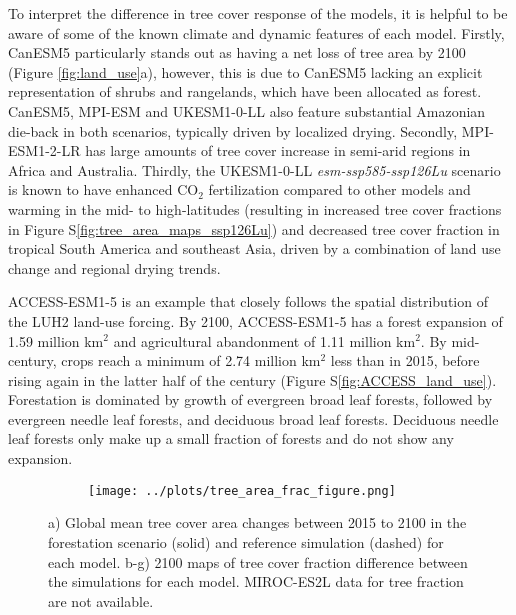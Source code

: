 \documentclass[]{article}
\begin{document}
To interpret the difference in tree cover response of the models, it is helpful to be aware of some of the known climate and dynamic features of each model.
Firstly, CanESM5 particularly stands out as having a net loss of tree area by 2100 (Figure \ref{fig:land_use}a), however, this is due to CanESM5 lacking an explicit representation of shrubs and rangelands, which have been allocated as forest.
CanESM5, MPI-ESM and UKESM1-0-LL also feature substantial Amazonian die-back in both scenarios, typically driven by localized drying.
Secondly, MPI-ESM1-2-LR has large amounts of tree cover increase in semi-arid regions in Africa and Australia.
Thirdly, the UKESM1-0-LL \textit{esm-ssp585-ssp126Lu} scenario is known to have enhanced CO$_2$ fertilization compared to other models and warming in the mid- to high-latitudes (resulting in increased tree cover fractions in Figure S\ref{fig:tree_area_maps_ssp126Lu}) and decreased tree cover fraction in tropical South America and southeast Asia, driven by a combination of land use change and regional drying trends.

ACCESS-ESM1-5 is an example that closely follows the spatial distribution of the LUH2 land-use forcing.
By 2100, ACCESS-ESM1-5 has a forest expansion of 1.59 million km$^2$ and agricultural abandonment of 1.11 million km$^2$.
By mid-century, crops reach a minimum of 2.74 million km$^2$ less than in 2015, before rising again in the latter half of the century (Figure S\ref{fig:ACCESS_land_use}).
Forestation is dominated by growth of evergreen broad leaf forests, followed by evergreen needle leaf forests, and deciduous broad leaf forests.
Deciduous needle leaf forests only make up a small fraction of forests and do not show any expansion.

\begin{figure}[H]
    \centering
    \begin{subfigure}[b]{0.8\linewidth}
        \texttt{[image: ../plots/tree\_area\_frac\_figure.png]}
    \end{subfigure}
    \caption{a) Global mean tree cover area changes between 2015 to 2100 in the forestation scenario (solid) and reference simulation (dashed) for each model. b-g) 2100 maps of tree cover fraction difference between the simulations for each model. MIROC-ES2L data for tree fraction are not available.}
    \label{fig:land_use_map}
\end{figure}
\end{document}
